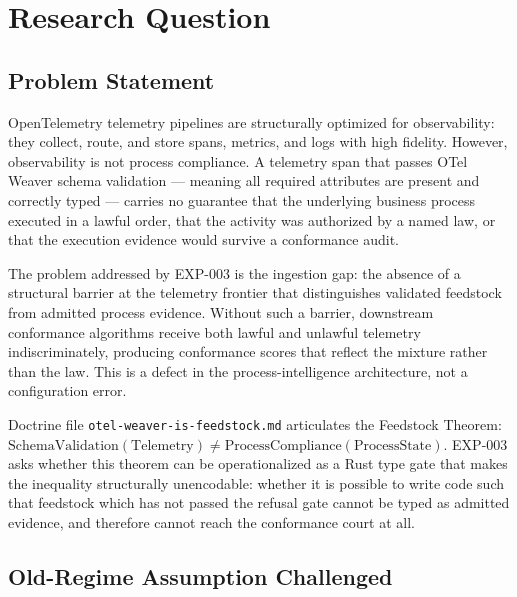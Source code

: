 
\section{Research Question}
\label{sec:otel-weaver-exp-003-live-check-to-refusal-question}

\subsection{Problem Statement}
\label{sec:otel-weaver-exp-003-live-check-to-refusal-question-problem}

OpenTelemetry telemetry pipelines are structurally optimized for observability: they
collect, route, and store spans, metrics, and logs with high fidelity. However,
observability is not process compliance. A telemetry span that passes OTel Weaver
schema validation --- meaning all required attributes are present and correctly typed
--- carries no guarantee that the underlying business process executed in a lawful
order, that the activity was authorized by a named law, or that the execution evidence
would survive a conformance audit.

The problem addressed by EXP-003 is the ingestion gap: the absence of a structural
barrier at the telemetry frontier that distinguishes validated feedstock from admitted
process evidence. Without such a barrier, downstream conformance algorithms receive
both lawful and unlawful telemetry indiscriminately, producing conformance scores that
reflect the mixture rather than the law. This is a defect in the process-intelligence
architecture, not a configuration error.

Doctrine file \texttt{otel-weaver-is-feedstock.md} articulates the Feedstock Theorem:
$\text{SchemaValidation}(\text{Telemetry}) \neq \text{ProcessCompliance}(\text{ProcessState})$.
EXP-003 asks whether this theorem can be operationalized as a Rust type gate that makes
the inequality structurally unencodable: whether it is possible to write code such
that feedstock which has not passed the refusal gate cannot be typed as admitted evidence,
and therefore cannot reach the conformance court at all.

\subsection{Old-Regime Assumption Challenged}
\label{sec:otel-weaver-exp-003-live-check-to-refusal-question-old-regime}

